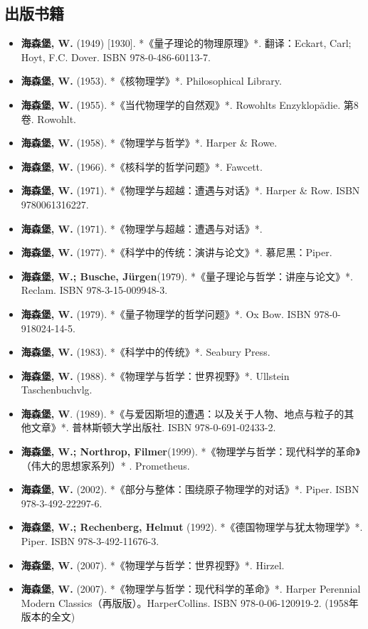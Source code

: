 \subsection{出版书籍}
\begin{itemize}
\item \textbf{海森堡, W.} (1949) [1930]. *《量子理论的物理原理》*. 翻译：Eckart, Carl; Hoyt, F.C. Dover. ISBN 978-0-486-60113-7.
\item \textbf{海森堡, W.} (1953). *《核物理学》*. Philosophical Library.
\item \textbf{海森堡, W.} (1955). *《当代物理学的自然观》*. Rowohlts Enzyklopädie. 第8卷. Rowohlt.
\item \textbf{海森堡, W.} (1958). *《物理学与哲学》*. Harper & Rowe.
\item \textbf{海森堡, W.} (1966). *《核科学的哲学问题》*. Fawcett.
\item \textbf{海森堡, W.} (1971). *《物理学与超越：遭遇与对话》*. Harper & Row. ISBN 9780061316227.
\item \textbf{海森堡, W.} (1971). *《物理学与超越：遭遇与对话》*.
\item \textbf{海森堡, W.} (1977). *《科学中的传统：演讲与论文》*. 慕尼黑：Piper.
\item \textbf{海森堡, W.; Busche, Jürgen}(1979). *《量子理论与哲学：讲座与论文》*. Reclam. ISBN 978-3-15-009948-3.
\item \textbf{海森堡, W.} (1979). *《量子物理学的哲学问题》*. Ox Bow. ISBN 978-0-918024-14-5.
\item \textbf{海森堡, W.} (1983). *《科学中的传统》*. Seabury Press.
\item \textbf{海森堡, W.} (1988). *《物理学与哲学：世界视野》*. Ullstein Taschenbuchvlg.
\item \textbf{海森堡, W}. (1989). *《与爱因斯坦的遭遇：以及关于人物、地点与粒子的其他文章》*. 普林斯顿大学出版社. ISBN 978-0-691-02433-2.
\item \textbf{海森堡, W.; Northrop, Filmer}(1999). *《物理学与哲学：现代科学的革命》（伟大的思想家系列）* . Prometheus.
\item \textbf{海森堡, W.} (2002). *《部分与整体：围绕原子物理学的对话》*. Piper. ISBN 978-3-492-22297-6.
\item \textbf{海森堡, W.; Rechenberg, Helmut} (1992). *《德国物理学与犹太物理学》*. Piper. ISBN 978-3-492-11676-3.
\item \textbf{海森堡, W.} (2007). *《物理学与哲学：世界视野》*. Hirzel.
\item \textbf{海森堡, W.} (2007). *《物理学与哲学：现代科学的革命》*. Harper Perennial Modern Classics（再版版）。HarperCollins. ISBN 978-0-06-120919-2. (1958年版本的全文)
\end{itemize}
